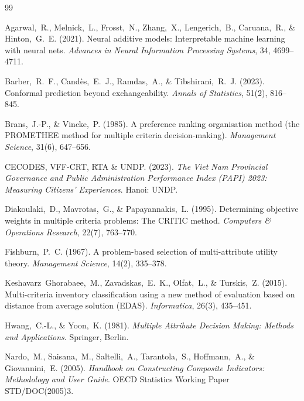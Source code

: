 \documentclass[12pt, a4paper]{article}
\begin{document}

\begin{thebibliography}{99}

Agarwal,~R., Melnick,~L., Frosst,~N., Zhang,~X., Lengerich,~B., Caruana,~R., \& Hinton,~G.~E. (2021).
Neural additive models: Interpretable machine learning with neural nets.
\textit{Advances in Neural Information Processing Systems}, 34, 4699--4711.

Barber,~R.~F., Candès,~E.~J., Ramdas,~A., \& Tibshirani,~R.~J. (2023).
Conformal prediction beyond exchangeability.
\textit{Annals of Statistics}, 51(2), 816--845.

Brans,~J.-P., \& Vincke,~P. (1985).
A preference ranking organisation method (the PROMETHEE method for
multiple criteria decision-making).
\textit{Management Science}, 31(6), 647--656.

CECODES, VFF-CRT, RTA \& UNDP. (2023).
\textit{The Viet Nam Provincial Governance and Public Administration Performance Index (PAPI) 2023: Measuring Citizens' Experiences}.
Hanoi: UNDP.

Diakoulaki,~D., Mavrotas,~G., \& Papayannakis,~L. (1995).
Determining objective weights in multiple criteria problems: The CRITIC method.
\textit{Computers \& Operations Research}, 22(7), 763--770.

Fishburn,~P.~C. (1967).
A problem-based selection of multi-attribute utility theory.
\textit{Management Science}, 14(2), 335--378.

Keshavarz~Ghorabaee,~M., Zavadskas,~E.~K., Olfat,~L., \& Turskis,~Z. (2015).
Multi-criteria inventory classification using a new method of evaluation based on distance from average solution (EDAS).
\textit{Informatica}, 26(3), 435--451.

Hwang,~C.-L., \& Yoon,~K. (1981).
\textit{Multiple Attribute Decision Making: Methods and Applications}.
Springer, Berlin.

Nardo,~M., Saisana,~M., Saltelli,~A., Tarantola,~S., Hoffmann,~A., \& Giovannini,~E. (2005).
\textit{Handbook on Constructing Composite Indicators: Methodology and User Guide}.
OECD Statistics Working Paper STD/DOC(2005)3.


\end{thebibliography}
\end{document}
